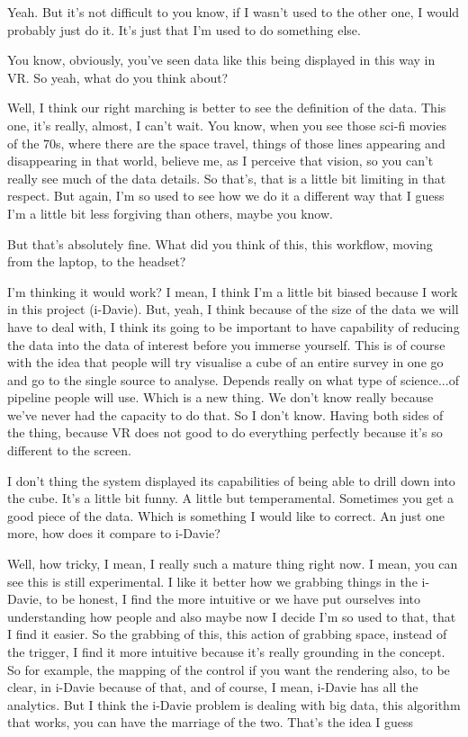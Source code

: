 \begin{description}
    \lucia Yeah. But it's not difficult to you know, if I wasn't used to the other one, I would probably just do it. It's just that I'm used to do something else.
    
    \mich You know, obviously, you've seen data like this being displayed in this way in VR. So yeah, what do you think about?
    
    \lucia Well, I think our right marching is better to see the definition of the data. This one, it's really, almost, I can't wait. You know, when you see those sci-fi movies of the 70s, where there are the space travel, things of those lines appearing and disappearing in that world, believe me, as I perceive that vision, so you can't really see much of the data details. So that's, that is a little bit limiting in that respect. But again, I'm so used to see how we do it a different way that I guess I'm a little bit less forgiving than others, maybe you know.
    
    \mich But that's absolutely fine. What did you think of this, this workflow, moving from the laptop, to the headset?
    
    \lucia I'm thinking it would work? I mean, I think I'm a little bit biased because I work in this project (i-Davie). But, yeah, I think because of the size of the data we will have to deal with, I think its going to be important to have capability of reducing the data into the data of interest before you immerse yourself. This is of course with the idea that people will try visualise a cube of an entire survey in one go and go to the single source to analyse. Depends really on what type of science...of pipeline people will use. Which is a new thing. We don't know really because we've never had the capacity to do that. So I don't know. Having both sides of the thing, because VR does not good to do everything perfectly because it's so different to the screen.
    
    \mich I don't thing the system displayed its capabilities of being able to drill down into the cube. It's a little bit funny. A little but temperamental. Sometimes you get a good piece of the data. Which is something I would like to correct. An just one more, how does it compare to i-Davie?
    
    \lucia Well, how tricky, I mean, I really such a mature thing right now. I mean, you can see this is still experimental. I like it better how we grabbing things in the i-Davie, to be honest, I find the more intuitive or we have put ourselves into understanding how people and also maybe now I decide I'm so used to that, that I find it easier. So the grabbing of this, this action of grabbing space, instead of the trigger, I find it more intuitive because it's really grounding in the concept. So for example, the mapping of the control if you want the rendering also, to be clear, in i-Davie because of that, and of course, I mean, i-Davie has all the analytics. But I think the i-Davie problem is dealing with big data, this algorithm that works, you can have the marriage of the two. That's the idea I guess

\end{description}